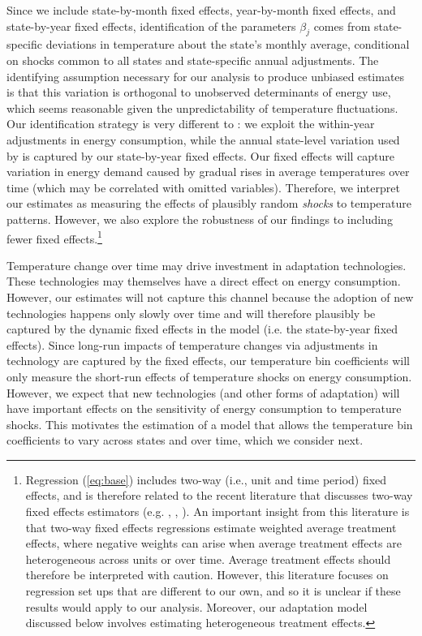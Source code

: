 \documentclass[11pt]{article}
\begin{document}
Since we include state-by-month fixed effects, year-by-month fixed effects, and state-by-year fixed effects, identification of the parameters $\beta_{j}$ comes from state-specific deviations in temperature about the state's monthly average, conditional on shocks common to all states and state-specific annual adjustments. The identifying assumption necessary for our analysis to produce unbiased estimates is that this variation is orthogonal to unobserved determinants of energy use, which seems reasonable given the unpredictability of temperature fluctuations. Our identification strategy is very different to \cite{Green2011}: we exploit the within-year adjustments in energy consumption, while the annual state-level variation used by \cite{Green2011} is captured by our state-by-year fixed effects. Our fixed effects will capture variation in energy demand caused by gradual rises in average temperatures over time (which may be correlated with omitted variables). Therefore, we interpret our estimates as measuring the effects of plausibly random \textit{shocks} to temperature patterns. However, we also explore the robustness of our findings to including fewer fixed effects.\footnote{ Regression (\ref{eq:base}) includes two-way (i.e., unit and time period) fixed effects, and is therefore related to the recent literature that discusses two-way fixed effects estimators (e.g. \cite{de2020two}, \cite{callaway2021difference}, \cite{goodman2021difference}). An important insight from this literature is that two-way fixed effects regressions estimate weighted average treatment effects, where negative weights can arise when average treatment effects are heterogeneous across units or over time. Average treatment effects should therefore be interpreted with caution. However, this literature focuses on regression set ups that are different to our own, and so it is unclear if these results would apply to our analysis. Moreover, our adaptation model discussed below involves estimating heterogeneous treatment effects.}

Temperature change over time may drive investment in adaptation technologies. These technologies may themselves have a direct effect on energy consumption. However, our estimates will not capture this channel because the adoption of new technologies happens only slowly over time and will therefore plausibly be captured by the dynamic fixed effects in the model (i.e. the state-by-year fixed effects). Since long-run impacts of temperature changes via adjustments in technology are captured by the fixed effects, our temperature bin coefficients will only measure the short-run effects of temperature shocks on energy consumption. However, we expect that new technologies (and other forms of adaptation) will have important effects on the sensitivity of energy consumption to temperature shocks. This motivates the estimation of a model that allows the temperature bin coefficients to vary across states and over time, which we consider next.  
\end{document}
